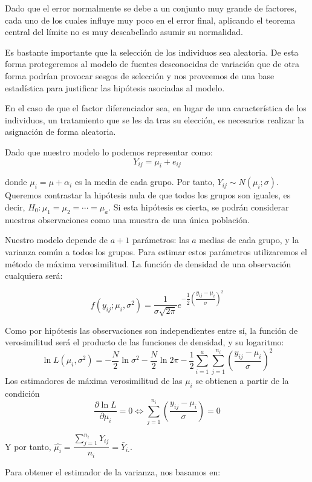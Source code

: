 Dado que el error normalmente se debe a un conjunto muy grande de factores, cada uno de los cuales influye muy poco en el error final, aplicando el teorema central del l\'imite no es muy descabellado asumir su normalidad.

Es bastante importante que la selecci\'on de los individuos sea aleatoria. De esta forma protegeremos al modelo de fuentes desconocidas de variaci\'on que de otra forma podr\'ian provocar sesgos de selecci\'on y nos proveemos de una base estad\'istica para justificar las hip\'otesis asociadas al modelo.

En el caso de que el factor diferenciador sea, en lugar de una caracter\'istica de los individuos, un tratamiento que se les da tras su elecci\'on, es necesarios realizar la asignaci\'on de forma aleatoria.

Dado que nuestro modelo lo podemos representar como:
\[Y_{ij}=\mu_i+e_{ij}\]

donde $\mu_i=\mu+\alpha_i$ es la media de cada grupo. Por tanto, $Y_{ij}\sim N(\mu_i;\sigma)$. Queremos contrastar la hip\'otesis nula de que todos los grupos son iguales, es decir, $H_0:\mu_1=\mu_2=\cdots=\mu_a$. Si esta hip\'otesis es cierta, se podr\'an considerar nuestras observaciones como una muestra de una \'unica poblaci\'on.

Nuestro modelo depende de $a+1$ par\'ametros: las $a$ medias de cada grupo, y la varianza com\'un a todos los grupos. Para estimar estos par\'ametros utilizaremos el m\'etodo de m\'axima verosimilitud. La funci\'on de densidad de una observaci\'on cualquiera ser\'a:

\[f(y_{ij};\mu_i,\sigma^2)=\dfrac{1}{\sigma\sqrt{2\pi}}e^{-\dfrac{1}{2}\left(\dfrac{y_{ij}-\mu_i}{\sigma}\right)^2}\]

Como por hip\'otesis las observaciones son independientes entre s\'i, la funci\'on de verosimilitud ser\'a el producto de las funciones de densidad, y su logaritmo:
\[\ln{L(\mu_i,\sigma^2)}=-\dfrac{N}{2}\ln{\sigma^2}-\dfrac{N}{2}\ln{2\pi}-\dfrac{1}{2}\sum_{i=1}^{a}\sum_{j=1}^{n_i}\left(\dfrac{y_{ij}-\mu_i}{\sigma}\right)^2\]
Los estimadores de m\'axima verosimilitud de las $\mu_i$ se obtienen a partir de la condici\'on \[\dfrac{\partial\ln{L}}{\partial\mu_i}=0\Leftrightarrow\sum_{j=1}^{n_i}\left(\dfrac{y_{ij}-\mu_i}{\sigma}\right)=0\]

Y por tanto, $\hat{\mu_i}=\dfrac{\sum_{j=1}^{n_i}Y_{ij}}{n_i}=\bar{Y}_{i.}$.

Para obtener el estimador de la varianza, nos basamos en:

